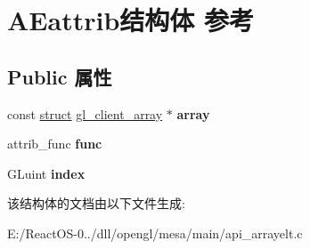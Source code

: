 \hypertarget{struct_a_eattrib}{}\section{A\+Eattrib结构体 参考}
\label{struct_a_eattrib}
\subsection*{Public 属性}
\begin{DoxyCompactItemize}
\item 
\mbox{\label{struct_a_eattrib_a27b4e23fb375f3cd2b5bf3c69f01e10f}} 
const \hyperlink{interfacestruct}{struct} \hyperlink{structgl__client__array}{gl\+\_\+client\+\_\+array} $\ast$ {\bfseries array}
\item 
\mbox{\label{struct_a_eattrib_a1d4c51075a195176c1b9dcb7135c6e7c}} 
attrib\+\_\+func {\bfseries func}
\item 
\mbox{\label{struct_a_eattrib_adac045c49cedb8231de783430b6ba5ae}} 
G\+Luint {\bfseries index}
\end{DoxyCompactItemize}


该结构体的文档由以下文件生成\+:\begin{DoxyCompactItemize}
\item 
E\+:/\+React\+O\+S-\/0../dll/opengl/mesa/main/api\+\_\+arrayelt.\+c\end{DoxyCompactItemize}
